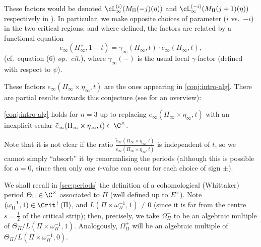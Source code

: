 \documentclass[10pt,reqno,a4paper]{amsart}
\begin{document}
	\begin{remarks}
  These factors would be denoted $\cL_\infty^{(i)}(M_\Pi(-j)(\eta))$ and $\cL_\infty^{(-i)}(M_\Pi(j+1)(\eta))$ respectively in \cite[\S1]{coates89}). In particular, we make opposite choices of parameter ($i$ vs.\ $-i$) in the two critical regions; and where defined, the factors are related by a functional equation
	 \begin{equation}\label{eq:modified infinity FE}
	 	e_\infty(\Pi_\infty^\vee,1 - t) = \gamma_\infty(\Pi_\infty, t) \cdot e_\infty(\Pi_\infty, t),
	 \end{equation}
	 (cf.\ equation (6) \emph{op.\ cit.}), where $\gamma_\infty(-)$ is the usual local $\gamma$-factor (defined with respect to $\psi$).
\end{remarks}

These factors $e_\infty(\Pi_\infty \times \eta_\infty, t)$ are the ones appearing in \cref{conj:intro-alg}. There are partial results towards this conjecture (see \cite{RagSac17} for an overview):

\begin{theorem}
\label{thm:mahnkopf}
 \cref{conj:intro-alg} holds for $n = 3$ up to replacing $e_\infty(\Pi_\infty \times \eta_\infty, t)$ with an inexplicit scalar $\tilde{e}_\infty(\Pi_\infty \times \eta_\infty, t) \in\C^\times$.
\end{theorem}

Note that it is not clear if the ratio $\frac{\tilde{e}_\infty(\Pi_\infty \times \eta_\infty, t)}{e_\infty(\Pi_\infty \times \eta_\infty, t)}$ is independent of $t$, so we cannot simply ``absorb'' it by renormalising the periods (although this is possible for $a = 0$, since then only one $t$-value can occur for each choice of sign $\pm$).


\begin{remark}\label{rem:periods}
We shall recall in \cref{sec:periods} the definition of a cohomological (Whittaker) period $\Theta_\Pi \in \C^\times$ associated to $\Pi$ (well defined up to $E^\times$). Note $(\omega_\Pi^{-1},1) \in \Crit^+(\Pi)$, and $L(\Pi\times\omega_\Pi^{-1},1) \neq 0$ (since it is far from the centre $s= \tfrac{1}{2}$ of the critical strip); then, precisely, we take $\Omega_\Pi^-$ to be an algebraic multiple of $\Theta_\Pi/L(\Pi\times\omega_\Pi^{-1},1)$. Analogously, $\Omega_\Pi^+$ will be an algebraic multiple of $\Theta_\Pi/L(\Pi\times \omega_\Pi^{-1}, 0)$.
\end{remark}
\end{document}
